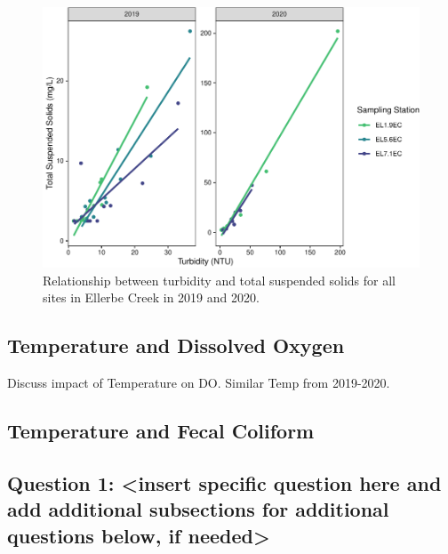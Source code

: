 \documentclass[
  12pt,
]{article}
\begin{document}
\begin{figure}
\centering
\includegraphics{August_Lindborg_ENV872_Project_files/figure-latex/unnamed-chunk-13-1.pdf}
\caption{Relationship between turbidity and total suspended solids for
all sites in Ellerbe Creek in 2019 and 2020.}
\end{figure}

\hypertarget{temperature-and-dissolved-oxygen}{%
\subsection{Temperature and Dissolved
Oxygen}\label{temperature-and-dissolved-oxygen}}

Discuss impact of Temperature on DO. Similar Temp from 2019-2020.

\hypertarget{temperature-and-fecal-coliform}{%
\subsection{Temperature and Fecal
Coliform}\label{temperature-and-fecal-coliform}}

\hypertarget{question-1-insert-specific-question-here-and-add-additional-subsections-for-additional-questions-below-if-needed}{%
\subsection{Question 1: \textless insert specific question here and add
additional subsections for additional questions below, if
needed\textgreater{}}\label{question-1-insert-specific-question-here-and-add-additional-subsections-for-additional-questions-below-if-needed}}
\end{document}
